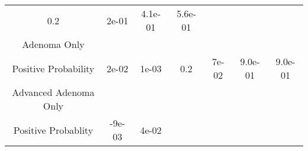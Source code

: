 \documentclass[12pt,]{article}
\begin{document}
\begin{longtable}[]{@{}ccccccc@{}}
\begin{minipage}[t]{0.08\columnwidth}
0.2\strut
\end{minipage} & \begin{minipage}[t]{0.10\columnwidth}\centering\strut
2e-01\strut
\end{minipage} & \begin{minipage}[t]{0.07\columnwidth}\centering\strut
4.1e-01\strut
\end{minipage} & \begin{minipage}[t]{0.09\columnwidth}\centering\strut
5.6e-01\strut
\end{minipage}\tabularnewline
\begin{minipage}[t]{0.26\columnwidth}\centering\strut
Adenoma Only\strut
\end{minipage}\tabularnewline
\begin{minipage}[t]{0.26\columnwidth}\centering\strut
Positive Probability\strut
\end{minipage} & \begin{minipage}[t]{0.09\columnwidth}\centering\strut
2e-02\strut
\end{minipage} & \begin{minipage}[t]{0.11\columnwidth}\centering\strut
1e-03\strut
\end{minipage} & \begin{minipage}[t]{0.08\columnwidth}\centering\strut
0.2\strut
\end{minipage} & \begin{minipage}[t]{0.10\columnwidth}\centering\strut
7e-02\strut
\end{minipage} & \begin{minipage}[t]{0.07\columnwidth}\centering\strut
9.0e-01\strut
\end{minipage} & \begin{minipage}[t]{0.09\columnwidth}\centering\strut
9.0e-01\strut
\end{minipage}\tabularnewline
\begin{minipage}[t]{0.26\columnwidth}\centering\strut
Advanced Adenoma Only\strut
\end{minipage}\tabularnewline
\begin{minipage}[t]{0.26\columnwidth}\centering\strut
Positive Probablity\strut
\end{minipage} & \begin{minipage}[t]{0.09\columnwidth}\centering\strut
-9e-03\strut
\end{minipage} & \begin{minipage}[t]{0.11\columnwidth}\centering\strut
4e-02\strut
\end{minipage} & \begin{minipage}[t]{0.08\columnwidth}\centering\strut

\end{minipage}
\end{longtable}
\end{document}
